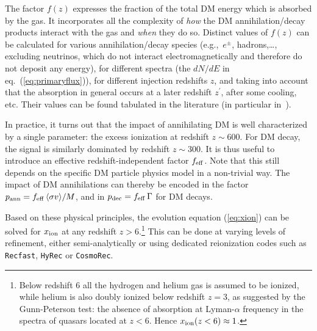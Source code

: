 The factor $f(z)$ expresses the fraction of the total DM energy which is absorbed by the gas. It incorporates all the complexity of {\it how} the DM annihilation/decay products interact with the gas and {\it when} they do so. Distinct values of $f(z)$ can be calculated for various annihilation/decay species (e.g.,\ $e^\pm$, hadrons,\ldots, excluding neutrinos, which do not interact electromagnetically and therefore do not deposit any energy), 
for different spectra (the $dN/dE$ in eq.~(\ref{eq:primaryflux})), for different injection redshifts $z$, and taking into account that the absorption in general occurs at a later redshift $z^\prime$, after some cooling, etc.  Their values can be found tabulated in the literature 
(in particular  in~\cite{CMBbounds}).

In practice, it turns out that the impact of annihilating DM is well characterized by a single parameter: 
the excess ionization at redshift $z \sim 600$. For DM decay, the signal is similarly dominated by redshift $z \sim 300$. It is thus useful to introduce an effective redshift-independent factor  $f_{\rm eff}$. Note that this still depends on the specific DM particle physics model in a non-trivial way. 
The impact of DM annihilations can thereby be encoded in the factor $p_{\rm ann} = f_{\rm eff} \, \langle \sigma v \rangle/M$,
and in $p_{\rm dec} = f_{\rm eff} \, \Gamma$ for DM decays.




Based on these physical principles, the evolution equation (\ref{eq:xion}) can be solved for $x_{\rm ion}$ at any redshift $z>6$.\footnote{Below redshift 6 all the hydrogen and helium gas is assumed to be ionized, while helium is also doubly ionized below redshift $z = 3$, as suggested by the Gunn-Peterson test: the absence of absorption at Lyman-$\alpha$ frequency in the spectra of quasars located at $z<6$. Hence $x_{\rm ion}(z<6) \approx 1$.} This can be done at varying levels of refinement, either semi-analytically or using dedicated reionization codes such as {\tt Recfast}, {\tt HyRec} or {\tt CosmoRec}.   


